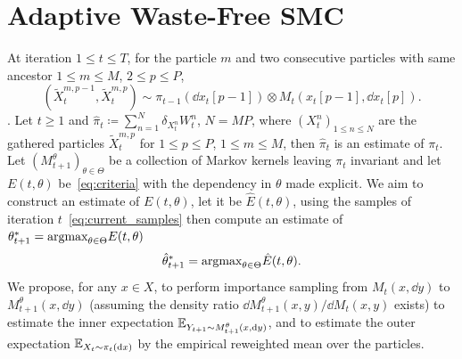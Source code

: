 \section{Adaptive Waste-Free SMC}
At iteration $1\leq t\leq T$, for the particle $m$ and two consecutive particles with same ancestor $1\leq m \leq M$, $2\leq p\leq P$,
\begin{equation}
    \label{eq:current_samples}
    (\tilde{X}_t^{m, p-1}, \tilde{X}_t^{m, p})
    \sim \pi_{t-1}(\dd x_t[p-1]) \otimes M_t(x_t[p-1], \dd x_t[p]).
\end{equation}
.
Let $t\geq 1$ and $\hat{\pi}_t\coloneq \sum_{n=1}^{N}\delta_{X_t^n}W_t^n$, $N=MP$, where $(X_t^n)_{1\leq n\leq N}$ are the gathered particles $\tilde{X}_{t}^{m,p}$ for $1\leq p\leq P$, $1\leq m \leq M$, then $\hat{\pi}_t$ is an estimate of $\pi_t$.
Let $(M^{\theta}_{t+1})_{\theta\in \Theta}$ be a collection of Markov kernels leaving $\pi_t$ invariant and let $E(t,\theta)$ be~\eqref{eq:criteria} with the dependency in $\theta$ made explicit.
We aim to construct an estimate of $E(t, \theta)$, let it be $\hat{E}(t, \theta)$, using the samples of iteration $t$~\eqref{eq:current_samples} then compute an estimate of $\theta^*_{t+1} = \textup{argmax}_{\theta \in \Theta}E(t, \theta)$
\begin{equation}
    \label{eq:maximisation_procedure}
    \hat{\theta}_{t+1}^{*} = \textup{argmax}_{\theta\in \Theta} \hat{E}(t, \theta).
\end{equation}
We propose, for any $x\in X$, to perform importance sampling from $M_t(x, \dd y)$ to $M_{t+1}^{\theta}(x, \dd y)$ (assuming the density ratio $\dd M_{t+1}^{\theta}(x, y)/\dd M_t(x, y)$ exists) to estimate the inner expectation $\mathbb{E}_{Y_{t+1}\sim M_{t+1}^{\theta}(x, \mathrm{d} y)}$, and to estimate the outer expectation $\mathbb{E}_{X_t\sim \pi_t(\mathrm{d} x)}$ by the empirical reweighted mean over the particles.
